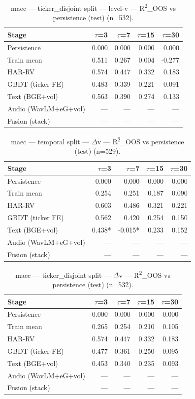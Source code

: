 \begin{table}[t]
\centering
\begin{tabular}{lrrrr}
\toprule
Stage & $\tau$=3 & $\tau$=7 & $\tau$=15 & $\tau$=30 \\
\midrule
Persistence & 0.000 & 0.000 & 0.000 & 0.000 \\
Train mean & 0.511 & 0.267 & 0.004 & -0.277 \\
HAR-RV & 0.574 & 0.447 & 0.332 & 0.183 \\
GBDT (ticker FE) & 0.483 & 0.339 & 0.221 & 0.091 \\
Text (BGE+vol) & 0.563 & 0.390 & 0.274 & 0.133 \\
Audio (WavLM+eG+vol) & — & — & — & — \\
Fusion (stack) & — & — & — & — \\
\bottomrule
\end{tabular}
\caption{maec — ticker\_disjoint split — level-v — R\textsuperscript{2}\_OOS vs persistence (test) (n=532).}
\end{table}

\begin{table}[t]
\centering
\begin{tabular}{lrrrr}
\toprule
Stage & $\tau$=3 & $\tau$=7 & $\tau$=15 & $\tau$=30 \\
\midrule
Persistence & 0.000 & 0.000 & 0.000 & 0.000 \\
Train mean & 0.254 & 0.251 & 0.187 & 0.090 \\
HAR-RV & 0.603 & 0.486 & 0.321 & 0.221 \\
GBDT (ticker FE) & 0.562 & 0.420 & 0.254 & 0.150 \\
Text (BGE+vol) & 0.438* & -0.015* & 0.233 & 0.152 \\
Audio (WavLM+eG+vol) & — & — & — & — \\
Fusion (stack) & — & — & — & — \\
\bottomrule
\end{tabular}
\caption{maec — temporal split — $\Delta$v — R\textsuperscript{2}\_OOS vs persistence (test) (n=529).}
\end{table}

\begin{table}[t]
\centering
\begin{tabular}{lrrrr}
\toprule
Stage & $\tau$=3 & $\tau$=7 & $\tau$=15 & $\tau$=30 \\
\midrule
Persistence & 0.000 & 0.000 & 0.000 & 0.000 \\
Train mean & 0.265 & 0.254 & 0.210 & 0.105 \\
HAR-RV & 0.574 & 0.447 & 0.332 & 0.183 \\
GBDT (ticker FE) & 0.477 & 0.361 & 0.250 & 0.095 \\
Text (BGE+vol) & 0.453 & 0.340 & 0.235 & 0.093 \\
Audio (WavLM+eG+vol) & — & — & — & — \\
Fusion (stack) & — & — & — & — \\
\bottomrule
\end{tabular}
\caption{maec — ticker\_disjoint split — $\Delta$v — R\textsuperscript{2}\_OOS vs persistence (test) (n=532).}
\end{table}

